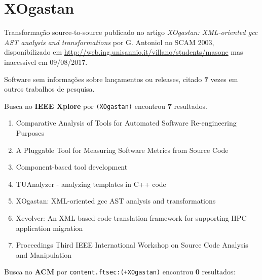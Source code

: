\section{XOgastan}

Transformação source-to-source
publicado no artigo {\it XOgastan: XML-oriented gcc AST analysis and transformations}
por G. Antoniol
no SCAM 2003,
disponibilizado em \url{http://web.ing.unisannio.it/villano/students/masone}
mas inacessível em 09/08/2017.

Software sem informações sobre lançamentos ou releases,
citado {\bf 7} vezes em outros trabalhos de pesquisa.

Busca no {\bf IEEE Xplore} por
\texttt{(XOgastan)}
encontrou {\bf 7}
resultados.

\begin{enumerate}
\item Comparative Analysis of Tools for Automated Software Re-engineering Purposes
\item A Pluggable Tool for Measuring Software Metrics from Source Code
\item Component-based tool development
\item TUAnalyzer - analyzing templates in C++ code
\item XOgastan: XML-oriented gcc AST analysis and transformations
\item Xevolver: An XML-based code translation framework for supporting HPC application migration
\item Proceedings Third IEEE International Workshop on Source Code Analysis and Manipulation
\end{enumerate}

Busca no {\bf ACM} por
\texttt{content.ftsec:(+XOgastan)}
encontrou {\bf 0}
resultados:



